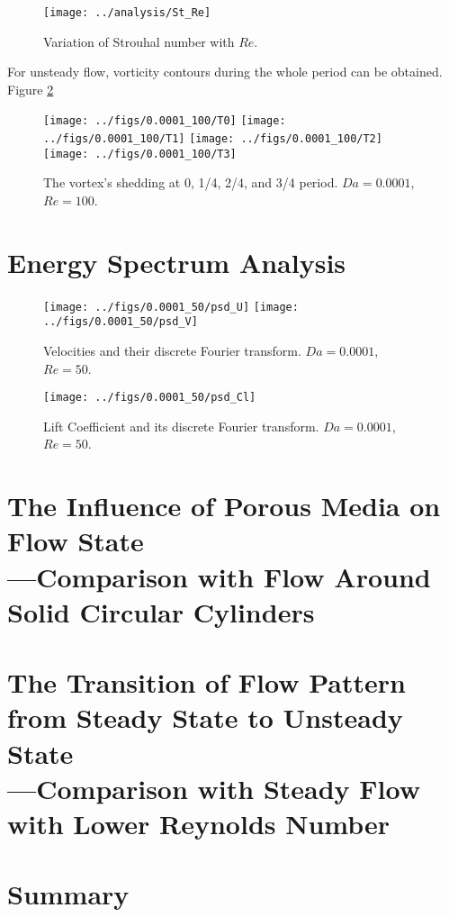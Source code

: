 \begin{figure}
	\centering
	\texttt{[image: ../analysis/St\_Re]}
	\caption{Variation of Strouhal number with $Re$.}
	\label{fig: St}
\end{figure}

For unsteady flow, vorticity contours during the whole period can be obtained. Figure \ref{fig: 4*vortex}

\begin{figure}[h]
	\centering
	{\texttt{[image: ../figs/0.0001\_100/T0]}}
	{\texttt{[image: ../figs/0.0001\_100/T1]}}
	{\texttt{[image: ../figs/0.0001\_100/T2]}}
	{\texttt{[image: ../figs/0.0001\_100/T3]}}
	\caption{The vortex's shedding at 0, 1/4, 2/4, and 3/4 period.
		$Da=0.0001$, $Re=100$.}
	\label{fig: 4*vortex}
\end{figure}


\section{Energy Spectrum Analysis} %
\begin{figure}
	\centering
	\texttt{[image: ../figs/0.0001\_50/psd\_U]}
	\texttt{[image: ../figs/0.0001\_50/psd\_V]}
	\caption{Velocities and their discrete Fourier transform. $Da=0.0001$, $Re=50$.}
\end{figure}
\begin{figure}
	\centering
	\texttt{[image: ../figs/0.0001\_50/psd\_Cl]}
	\caption{Lift Coefficient and its discrete Fourier transform. $Da=0.0001$, $Re=50$.}
\end{figure}


\section{The Influence of Porous Media on Flow State\\
	---Comparison with Flow Around Solid Circular Cylinders}


\section{The Transition of Flow Pattern from Steady State to Unsteady State\\
	---Comparison with Steady Flow with Lower Reynolds Number}


\section{Summary}
